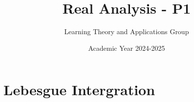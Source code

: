 \documentclass[10pt, oneside]{article}
\title{Real Analysis - P1}
\author{Learning Theory and Applications Group}
\date{Academic Year 2024-2025}
\begin{document}
\maketitle
\tableofcontents

\vspace{.25in}


\part{Lebesgue Intergration}


\end{document}
